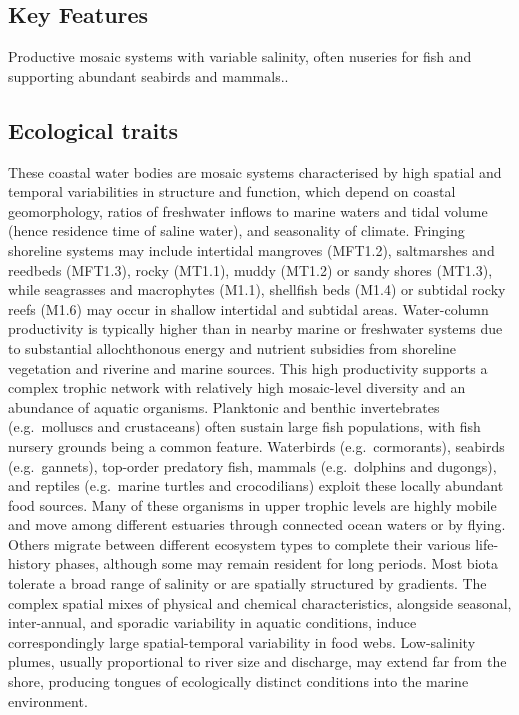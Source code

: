 \documentclass[
  letterpaper,
  DIV=11,
  numbers=noendperiod]{scrartcl}
\begin{document}
\subsection{Key Features}\label{key-features-132}

Productive mosaic systems with variable salinity, often nuseries for
fish and supporting abundant seabirds and mammals..

\subsection{Ecological traits}\label{ecological-traits-132}

These coastal water bodies are mosaic systems characterised by high
spatial and temporal variabilities in structure and function, which
depend on coastal geomorphology, ratios of freshwater inflows to marine
waters and tidal volume (hence residence time of saline water), and
seasonality of climate. Fringing shoreline systems may include
intertidal mangroves (MFT1.2), saltmarshes and reedbeds (MFT1.3), rocky
(MT1.1), muddy (MT1.2) or sandy shores (MT1.3), while seagrasses and
macrophytes (M1.1), shellfish beds (M1.4) or subtidal rocky reefs (M1.6)
may occur in shallow intertidal and subtidal areas. Water-column
productivity is typically higher than in nearby marine or freshwater
systems due to substantial allochthonous energy and nutrient subsidies
from shoreline vegetation and riverine and marine sources. This high
productivity supports a complex trophic network with relatively high
mosaic-level diversity and an abundance of aquatic organisms. Planktonic
and benthic invertebrates (e.g.~molluscs and crustaceans) often sustain
large fish populations, with fish nursery grounds being a common
feature. Waterbirds (e.g.~cormorants), seabirds (e.g.~gannets),
top-order predatory fish, mammals (e.g.~dolphins and dugongs), and
reptiles (e.g.~marine turtles and crocodilians) exploit these locally
abundant food sources. Many of these organisms in upper trophic levels
are highly mobile and move among different estuaries through connected
ocean waters or by flying. Others migrate between different ecosystem
types to complete their various life-history phases, although some may
remain resident for long periods. Most biota tolerate a broad range of
salinity or are spatially structured by gradients. The complex spatial
mixes of physical and chemical characteristics, alongside seasonal,
inter-annual, and sporadic variability in aquatic conditions, induce
correspondingly large spatial-temporal variability in food webs.
Low-salinity plumes, usually proportional to river size and discharge,
may extend far from the shore, producing tongues of ecologically
distinct conditions into the marine environment.
\end{document}
